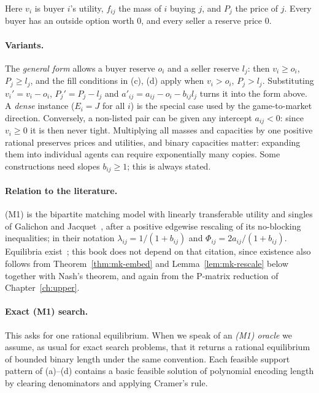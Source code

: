Here $v_i$ is buyer $i$'s utility, $f_{ij}$ the mass of $i$ buying $j$, and $P_j$ the price of $j$.
Every buyer has an outside option worth $0$, and every seller a reserve price $0$.

\paragraph{Variants.} The \emph{general form} allows a buyer reserve $o_i$ and a seller reserve $l_j$:
then $v_i\ge o_i$, $P_j\ge l_j$, and the fill conditions in (c), (d) apply when $v_i>o_i$, $P_j>l_j$.
Substituting $v_i'=v_i-o_i$, $P_j'=P_j-l_j$ and $a'_{ij}=a_{ij}-o_i-b_{ij}l_j$ turns it into the form
above. A \emph{dense} instance ($E_i=J$ for all $i$) is the special case used by the game-to-market
direction. Conversely, a non-listed pair can be given any intercept $a_{ij}<0$: since $v_i\ge0$ it is
then never tight. Multiplying all masses and capacities by one positive rational preserves prices and
utilities, and binary capacities matter: expanding them into individual agents can require
exponentially many copies. Some constructions need slopes $b_{ij}\ge1$; this is always stated.

\paragraph{Relation to the literature.} (M1) is the bipartite matching model with linearly
transferable utility and singles of Galichon and Jacquet~\cite[\S2]{galichon25}, after a positive
edgewise rescaling of its no-blocking inequalities; in their notation $\lambda_{ij}=1/(1+b_{ij})$ and
$\Phi_{ij}=2a_{ij}/(1+b_{ij})$. Equilibria exist~\cite[\S3, Theorem~1 and the corollary after it; Appendix~A for nonpositive outputs]{galichon25}; this book does
not depend on that citation, since existence also follows from Theorem~\ref{thm:mk-embed} and Lemma~\ref{lem:mk-rescale}
below together with Nash's theorem, and again from the P-matrix reduction of Chapter~\ref{ch:upper}.

\paragraph{Exact (M1) search.} This asks for one rational equilibrium. When we speak of an \emph{(M1)
oracle} we assume, as usual for exact search problems, that it returns a rational equilibrium of
bounded binary length under the same convention. Each feasible support
pattern of (a)--(d) contains a basic feasible solution of polynomial
encoding length by clearing denominators and applying Cramer's rule.

